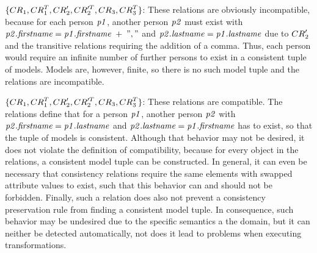 \begin{example}
\begin{properdescription}
\item[$\setted{\consistencyrelation{CR}{1}, \consistencyrelation{CR}{1}^T,\consistencyrelation{CR}{2}', \consistencyrelation{CR}{2}'^T, \consistencyrelation{CR}{3}, \consistencyrelation{CR}{3}^T}$:]
These relations are obviously incompatible, because for each person $\mathit{p1}$, another person $\mathit{p2}$ must exist with $\mathit{p2.firstname} = \mathit{p1.firstname}\; +\; ","$ and $\mathit{p2.lastname} = \mathit{p1.lastname}$ due to $\consistencyrelation{CR}{2}'$ and the transitive relations requiring the addition of a comma. Thus, each person would require an infinite number of further persons to exist in a consistent tuple of models. Models are, however, finite, so there is no such model tuple and the relations are incompatible.

\item[$\setted{\consistencyrelation{CR}{1}, \consistencyrelation{CR}{1}^T, \consistencyrelation{CR}{2}', \consistencyrelation{CR}{2}'^T, \consistencyrelation{CR}{3}, \consistencyrelation{CR}{3}^T}$:]
These relations are compatible. The relations define that for a person $\mathit{p1}$, another person $\mathit{p2}$ with $\mathit{p2.firstname} = \mathit{p1.lastname}$ and $\mathit{p2.lastname} = \mathit{p1.firstname}$ has to exist, so that the tuple of models is consistent.
Although that behavior may not be desired, it does not violate the definition of compatibility, because for every object in the relations, a consistent model tuple can be constructed.
In general, it can even be necessary that consistency relations require the same elements with swapped attribute values to exist, such that this behavior can and should not be forbidden.
Finally, such a relation does also not prevent a consistency preservation rule from finding a consistent model tuple.
In consequence, such behavior may be undesired due to the specific semantics a the domain, but it can neither be detected automatically, not does it lead to problems when executing transformations.


\end{properdescription}
\end{example}
